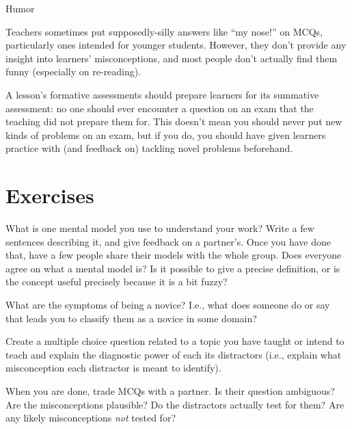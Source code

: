 \begin{callout}{Humor}

  Teachers sometimes put supposedly-silly answers like ``my nose!''
  on MCQs, particularly ones intended for younger students. However,
  they don't provide any insight into learners' misconceptions, and
  most people don't actually find them funny (especially on
  re-reading).

\end{callout}

A lesson's formative assessments should prepare learners for its
summative assessment: no one should ever encounter a question on an
exam that the teaching did not prepare them for. This doesn't mean you
should never put new kinds of problems on an exam, but if you do, you
should have given learners practice with (and feedback on) tackling
novel problems beforehand.

\section{Exercises}\label{s:models-exercises}


What is one mental model you use to understand your work?  Write a few
sentences describing it, and give feedback on a partner's.  Once you
have done that, have a few people share their models with the whole
group.  Does everyone agree on what a mental model is?  Is it possible
to give a precise definition, or is the concept useful precisely
because it is a bit fuzzy?


What are the symptoms of being a novice? I.e., what does someone do or
say that leads you to classify them as a novice in some domain?


Create a multiple choice question related to a topic you have taught
or intend to teach and explain the diagnostic power of each its
distractors (i.e., explain what misconception each distractor is meant
to identify).

When you are done, trade MCQs with a partner.  Is their question
ambiguous?  Are the misconceptions plausible?  Do the distractors
actually test for them?  Are any likely misconceptions \emph{not}
tested for?


